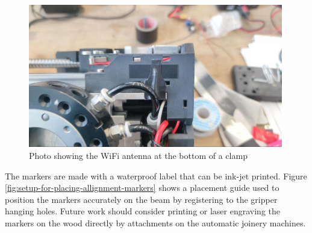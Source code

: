 \begin{figure}[!h]
    \centering
    \includegraphics[width=0.99\textwidth]{images/08/img19.jpg}
    \caption{Photo showing the WiFi antenna at the bottom of a clamp}
    \label{fig:wifi-antenna-on-clamp}
\end{figure}

\FloatBarrier

The markers are made with a waterproof label that can be ink-jet printed. Figure \ref{fig:setup-for-placing-allignment-markers} shows a placement guide used to position the markers accurately on the beam by registering to the gripper hanging holes. Future work should consider printing or laser engraving the markers on the wood directly by attachments on the automatic joinery machines.


